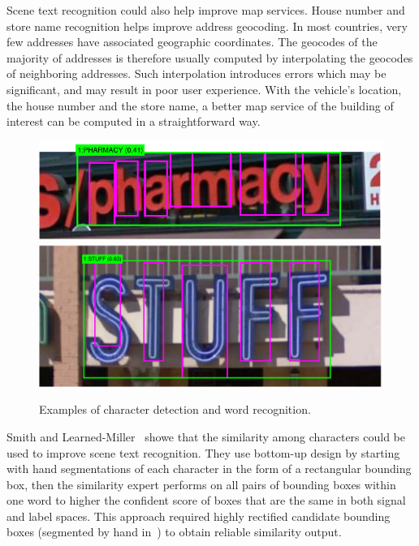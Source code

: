 \documentclass[10pt,twocolumn,letterpaper]{article}
\begin{document}
Scene text recognition could also help improve map services. House number and store name recognition helps improve address geocoding. In most countries, very few addresses have associated geographic coordinates. The geocodes of the majority of addresses is therefore usually computed by interpolating the geocodes of neighboring addresses. Such interpolation introduces errors which may be significant, and may result in poor user experience. With the vehicle's location, the house number and the store name, a better map service of the building of interest can be computed in a straightforward way.

\begin{figure}[t]
\begin{center}
\includegraphics[width=1\linewidth]{fig/p2}
\includegraphics[width=1\linewidth]{fig/p1}
\end{center}
   \caption{Examples of character detection and word recognition.}
\label{fig:sample1}
\end{figure}

Smith and Learned-Miller~\cite{118} showe that the similarity among characters could be used to improve scene text recognition. They use bottom-up design by starting with hand segmentations of each character in the form of a rectangular bounding box, then the similarity expert performs on all pairs of bounding boxes within one word to higher the confident score of boxes that are the same in both signal and label spaces. This approach required highly rectified candidate bounding boxes (segmented by hand in~\cite{118}) to obtain reliable similarity output.
\end{document}
